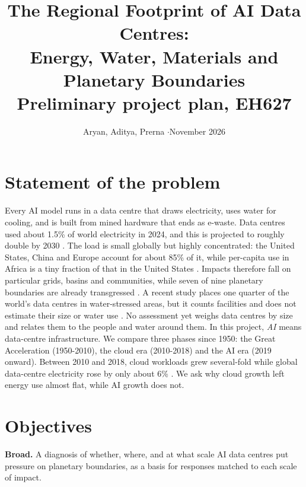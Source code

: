 \documentclass[10pt,a4paper]{article}
\title{\vspace{-1.6cm}\textbf{The Regional Footprint of AI Data Centres:\\Energy, Water, Materials and Planetary Boundaries}\\[2pt]
\large Preliminary project plan, EH627}
\author{Aryan, Aditya, Prerna \quad$\cdot$\quad November 2026}
\date{}
\begin{document}
\maketitle
\vspace{-1.4cm}

\section{Statement of the problem}
Every AI model runs in a data centre that draws electricity, uses water for cooling, and is built from mined hardware that ends as e-waste. Data centres used about 1.5\% of world electricity in 2024, and this is projected to roughly double by 2030 \citep{iea2025}. The load is small globally but highly concentrated: the United States, China and Europe account for about 85\% of it, while per-capita use in Africa is a tiny fraction of that in the United States \citep{iea2025}. Impacts therefore fall on particular grids, basins and communities, while seven of nine planetary boundaries are already transgressed \citep{phc2025}. A recent study places one quarter of the world's data centres in water-stressed areas, but it counts facilities and does not estimate their size or water use \citep{rosa2026}. No assessment yet weighs data centres by size and relates them to the people and water around them. In this project, \emph{AI} means data-centre infrastructure. We compare three phases since 1950: the Great Acceleration (1950-2010), the cloud era (2010-2018) and the AI era (2019 onward). Between 2010 and 2018, cloud workloads grew several-fold while global data-centre electricity rose by only about 6\% \citep{masanet2020}. We ask why cloud growth left energy use almost flat, while AI growth does not.

\section{Objectives}
\textbf{Broad.} A diagnosis of whether, where, and at what scale AI data centres put pressure on planetary boundaries, as a basis for responses matched to each scale of impact.
\end{document}
